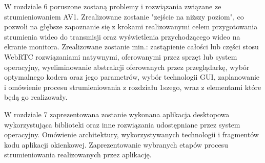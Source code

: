 W rozdziale 6 poruszone zostaną problemy i rozwiązania związane ze strumieniowaniem AV1. Zrealizowane zostanie "zejście
na niższy poziom", co pozwoli na głębsze zapoznanie się z krokami realizowanymi celem przygotowania strumienia wideo do
transmisji oraz wyświetlenia przychodzącego wideo na ekranie monitora. Zrealizowane zostanie min.: zastąpienie całości
lub części stosu WebRTC rozwiązaniami natywnymi, oferowanymi przez sprzęt lub system operacyjny, wyeliminowanie
abstrakcji oferowanych przez przeglądarkę, wybór optymalnego kodera oraz jego parametrów, wybór technologii GUI,
zaplanowanie i omówienie procesu strumieniowania z rozdziału 1szego, wraz z elementami które będą go realizowały.

W rozdziale 7 zaprezentowana zostanie wykonana aplikacja desktopowa wykorzystująca biblioteki oraz inne rozwiązania
udostępniane przez system operacyjny. Omówienie architektury, wykorzystywanych technologii i fragmentów kodu aplikacji
okienkowej. Zaprezentowanie wybranych etapów procesu strumieniowania realizowanych przez aplikację.
